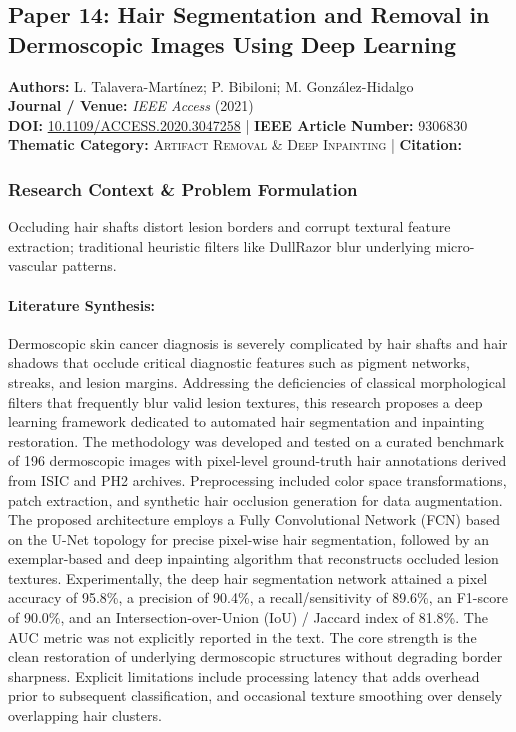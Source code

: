 \subsection{Paper 14: Hair Segmentation and Removal in Dermoscopic Images Using Deep Learning}
\label{sec:paper_14}

\begin{tcolorbox}[colback=gray!5!white,colframe=gray!75!black,title=\textbf{Metadata \& Citation Summary}]
\textbf{Authors:} L. Talavera-Martínez; P. Bibiloni; M. González-Hidalgo \\
\textbf{Journal / Venue:} \textit{IEEE Access} (2021) \\
\textbf{DOI:} \href{https://doi.org/10.1109/ACCESS.2020.3047258}{10.1109/ACCESS.2020.3047258} \quad | \quad \textbf{IEEE Article Number:} 9306830 \\
\textbf{Thematic Category:} \textsc{Artifact Removal \& Deep Inpainting} \quad | \quad \textbf{Citation:} \cite{9306830}
\end{tcolorbox}

\subsubsection*{Research Context \& Problem Formulation}
Occluding hair shafts distort lesion borders and corrupt textural feature extraction; traditional heuristic filters like DullRazor blur underlying micro-vascular patterns.

\paragraph{Literature Synthesis:} Dermoscopic skin cancer diagnosis is severely complicated by hair shafts and hair shadows that occlude critical diagnostic features such as pigment networks, streaks, and lesion margins. Addressing the deficiencies of classical morphological filters that frequently blur valid lesion textures, this research proposes a deep learning framework dedicated to automated hair segmentation and inpainting restoration. The methodology was developed and tested on a curated benchmark of 196 dermoscopic images with pixel-level ground-truth hair annotations derived from ISIC and PH2 archives. Preprocessing included color space transformations, patch extraction, and synthetic hair occlusion generation for data augmentation. The proposed architecture employs a Fully Convolutional Network (FCN) based on the U-Net topology for precise pixel-wise hair segmentation, followed by an exemplar-based and deep inpainting algorithm that reconstructs occluded lesion textures. Experimentally, the deep hair segmentation network attained a pixel accuracy of 95.8\%, a precision of 90.4\%, a recall/sensitivity of 89.6\%, an F1-score of 90.0\%, and an Intersection-over-Union (IoU) / Jaccard index of 81.8\%. The AUC metric was not explicitly reported in the text. The core strength is the clean restoration of underlying dermoscopic structures without degrading border sharpness. Explicit limitations include processing latency that adds overhead prior to subsequent classification, and occasional texture smoothing over densely overlapping hair clusters.

